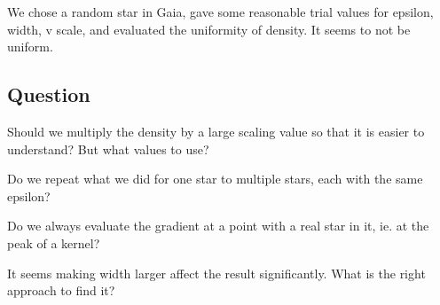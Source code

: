 \documentclass[12pt]{article}
\begin{document}
We chose a random star in Gaia, gave some reasonable trial values for epsilon, width, v scale, and evaluated the uniformity of density. It seems to not be uniform.

\subsection*{Question}
Should we multiply the density by a large scaling value so that it is easier to understand? But what values to use?

Do we repeat what we did for one star to multiple stars, each with the same epsilon?

Do we always evaluate the gradient at a point with a real star in it, ie. at the peak of a kernel?

It seems making width larger affect the result significantly. What is the right approach to find it?
 
\end{document}
